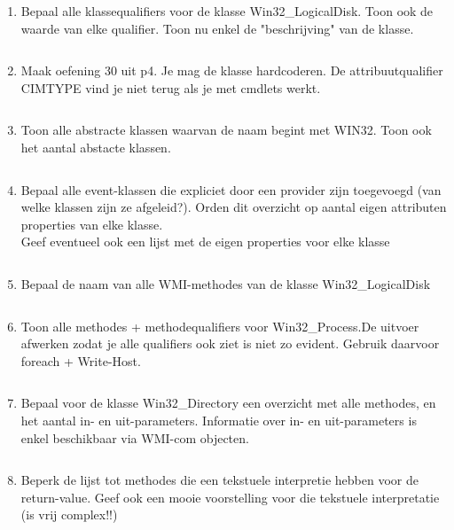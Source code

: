 \documentclass[11pt,a4paper]{report}
\begin{document}
\begin{enumerate}[resume]
\begin{lstlisting}
	\end{lstlisting}
	\item Bepaal alle klassequalifiers voor de klasse Win32\_LogicalDisk. Toon ook de waarde van elke qualifier.
	Toon nu enkel de "beschrijving" van de klasse.
	\begin{lstlisting}

	\end{lstlisting}
	\item Maak oefening 30 uit p4. Je mag de klasse hardcoderen. De attribuutqualifier CIMTYPE vind je niet terug als je met cmdlets werkt.
	\begin{lstlisting}

	\end{lstlisting}
	\item Toon alle abstracte klassen waarvan de naam begint met WIN32. Toon ook het aantal abstacte klassen.
	\begin{lstlisting}

	\end{lstlisting}
	\item Bepaal alle event-klassen die expliciet door een provider zijn toegevoegd (van welke klassen zijn ze afgeleid?).
	Orden dit overzicht op aantal eigen attributen properties van elke klasse.
	\\Geef eventueel ook een lijst met de eigen properties voor elke klasse
	\begin{lstlisting}

	\end{lstlisting}
	\item Bepaal de naam van alle WMI-methodes van de klasse Win32\_LogicalDisk
	\begin{lstlisting}

	\end{lstlisting}
	\item Toon alle methodes + methodequalifiers voor Win32\_Process.De uitvoer afwerken zodat je alle qualifiers ook ziet is niet zo evident. Gebruik daarvoor foreach + Write-Host.
	\begin{lstlisting}

	\end{lstlisting}
	\item Bepaal voor de klasse Win32\_Directory een overzicht met alle methodes, en het aantal in- en uit-parameters.
	Informatie over in- en uit-parameters is enkel beschikbaar via WMI-com objecten.
	\begin{lstlisting}

	\end{lstlisting}
	\item Beperk de lijst tot methodes die een tekstuele interpretie hebben voor de return-value. Geef ook een mooie voorstelling voor die tekstuele interpretatie (is vrij complex!!)
	\begin{lstlisting}

	\end{lstlisting}	
\end{enumerate}
\end{document}

